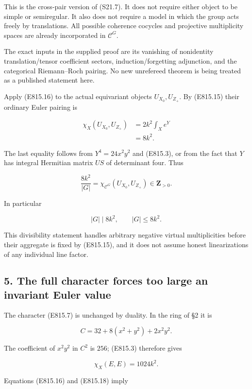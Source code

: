 This is the cross-pair version of (S21.7). It does not require either
object to be simple or semiregular. It also does not require a model in
which the group acts freely by translations. All possible coherence
cocycles and projective multiplicity spaces are already incorporated in
\(\mathcal C^G\).

The exact inputs in the supplied proof are its vanishing of nonidentity
translation/tensor coefficient sectors, induction/forgetting adjunction,
and the categorical Riemann--Roch pairing. No new unrefereed theorem is
being treated as a published statement here.

Apply (E815.16) to the actual equivariant objects \(U_{X_0},U_{Z_+}\).
By (E815.15) their ordinary Euler pairing is

\[
 \begin{split}
 \chi_X(U_{X_0},U_{Z_+})
 &=2k^2\int_X e^Y\\
 &=8k^2.
 \end{split}
 \tag{E815.17}
\]

The last equality follows from \(Y^4=24x^2y^2\) and (E815.3), or from
the fact that \(Y\) has integral Hermitian matrix \(US\) of determinant
four. Thus

\[
 \frac{8k^2}{|G|}
   =\chi_{\mathcal C^G}(U_{X_0},U_{Z_+})
   \in\mathbf Z_{>0}.
\]

In particular

\[
 |G|\mid8k^2,
 \qquad |G|\le8k^2.
 \tag{E815.18}
\]

This divisibility statement handles arbitrary negative virtual
multiplicities before their aggregate is fixed by (E815.15), and it does
not assume honest linearizations of any individual line factor.

\subsection{5. The full character forces too large an invariant Euler
value}\label{SF-E815-the-full-character-forces-too-large-an-invariant-euler-value}

The character (E815.7) is unchanged by duality. In the ring of §2 it is

\[
 C=32+8(x^2+y^2)+2x^2y^2.
\]

The coefficient of \(x^2y^2\) in \(C^2\) is \(256\); (E815.3) therefore
gives

\[
 \chi_X(E,E)=1024k^2.
 \tag{E815.19}
\]

Equations (E815.16) and (E815.18) imply

